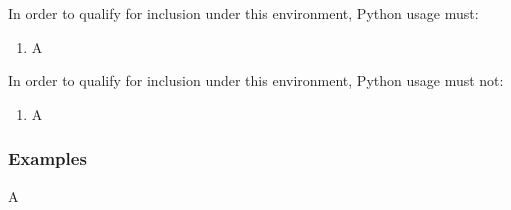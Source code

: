 			In order to qualify for inclusion under this environment, Python usage must:

			\begin{enumerate}
        		\item A
        	\end{enumerate}

			In order to qualify for inclusion under this environment, Python usage must not:

			\begin{enumerate}
        		\item A
        	\end{enumerate}

		\subsubsection{Examples}

			A
